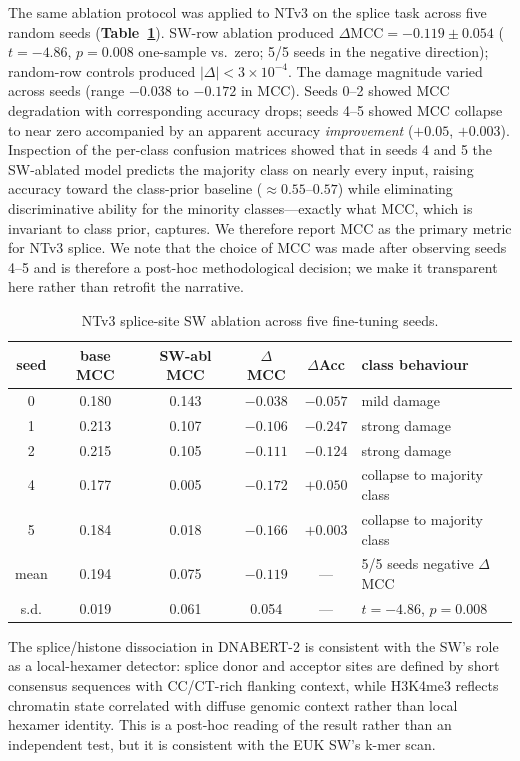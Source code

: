 \documentclass[11pt]{article}
\begin{document}
The same ablation protocol was applied to NTv3 on the splice task
across five random seeds (\textbf{Table~\ref{tab:ntv3}}). SW-row
ablation produced $\Delta\mathrm{MCC} = -0.119 \pm 0.054$
($t = -4.86$, $p = 0.008$ one-sample vs.\ zero; 5/5 seeds in the
negative direction); random-row controls produced
$|\Delta| < 3 \times 10^{-4}$. The damage magnitude varied across
seeds (range $-0.038$ to $-0.172$ in MCC). Seeds 0--2 showed
MCC degradation with corresponding accuracy drops; seeds 4--5
showed MCC collapse to near zero accompanied by an apparent
accuracy \emph{improvement} ($+0.05$, $+0.003$). Inspection of the
per-class confusion matrices showed that in seeds 4 and 5 the
SW-ablated model predicts the majority class on nearly every input,
raising accuracy toward the class-prior baseline
($\approx 0.55$--$0.57$) while eliminating discriminative ability
for the minority classes---exactly what MCC, which is invariant to
class prior, captures. We therefore report MCC as the primary
metric for NTv3 splice. We note that the choice of MCC was made
after observing seeds 4--5 and is therefore a post-hoc methodological
decision; we make it transparent here rather than retrofit the
narrative.

\begin{table}[H]
\centering\small
\begin{tabular}{cccccl}
\toprule
seed & base MCC & SW-abl MCC & $\Delta$MCC & $\Delta$Acc & class behaviour\\
\midrule
0 & 0.180 & 0.143 & $-0.038$ & $-0.057$ & mild damage\\
1 & 0.213 & 0.107 & $-0.106$ & $-0.247$ & strong damage\\
2 & 0.215 & 0.105 & $-0.111$ & $-0.124$ & strong damage\\
4 & 0.177 & 0.005 & $-0.172$ & $+0.050$ & collapse to majority class\\
5 & 0.184 & 0.018 & $-0.166$ & $+0.003$ & collapse to majority class\\
\midrule
mean & 0.194 & 0.075 & $-0.119$ & --- & 5/5 seeds negative $\Delta$MCC\\
s.d. & 0.019 & 0.061 & 0.054 & --- & $t = -4.86$, $p = 0.008$\\
\bottomrule
\end{tabular}
\caption{NTv3 splice-site SW ablation across five fine-tuning seeds.}
\label{tab:ntv3}
\end{table}

The splice/histone dissociation in DNABERT-2 is consistent with the
SW's role as a local-hexamer detector: splice donor and acceptor
sites are defined by short consensus sequences with CC/CT-rich
flanking context, while H3K4me3 reflects chromatin state correlated
with diffuse genomic context rather than local hexamer identity.
This is a post-hoc reading of the result rather than an independent
test, but it is consistent with the EUK SW's k-mer scan.
\end{document}
